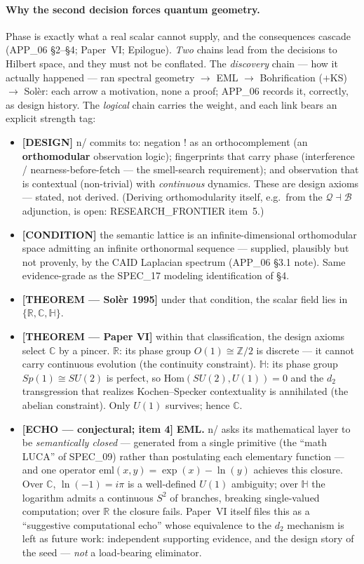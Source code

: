 \documentclass[11pt,a4paper]{article}
\newcommand{\Z}{\mathbb{Z}}
\newcommand{\C}{\mathbb{C}}
\newcommand{\HH}{\mathbb{H}}
\newcommand{\RR}{\mathbb{R}}
\theoremstyle{plain}
\theoremstyle{definition}
\theoremstyle{remark}
\begin{document}
\paragraph{Why the second decision forces quantum geometry.}
Phase is exactly what a real scalar cannot supply, and the consequences cascade
(APP\_06 \S2--\S4; Paper~VI; Epilogue). \emph{Two} chains lead from the
decisions to Hilbert space, and they must not be conflated. The
\emph{discovery} chain --- how it actually happened --- ran spectral geometry
$\to$ EML $\to$ Bohrification ($+$KS) $\to$ Sol\`er: each arrow a motivation,
none a proof; APP\_06 records it, correctly, as design history. The
\emph{logical} chain carries the weight, and each link bears an explicit
strength tag:
\begin{itemize}
  \item \textbf{[DESIGN]} n/ commits to: negation $!$ as an orthocomplement
  (an \textbf{orthomodular} observation logic); fingerprints that carry phase
  (interference / nearness-before-fetch --- the smell-search requirement); and
  observation that is contextual (non-trivial) with \emph{continuous}
  dynamics. These are design axioms --- stated, not derived. (Deriving
  orthomodularity itself, e.g.\ from the $\mathcal Q\dashv\mathcal B$
  adjunction, is open: RESEARCH\_FRONTIER item~5.)
  \item \textbf{[CONDITION]} the semantic lattice is an infinite-dimensional
  orthomodular space admitting an infinite orthonormal sequence --- supplied,
  plausibly but not provenly, by the CAID Laplacian spectrum (APP\_06 \S3.1
  note). Same evidence-grade as the SPEC\_17 modeling identification of \S4.
  \item \textbf{[THEOREM --- Sol\`er 1995]} under that condition, the scalar
  field lies in $\{\RR,\C,\HH\}$.
  \item \textbf{[THEOREM --- Paper VI]} within that classification, the design
  axioms select $\C$ by a pincer. $\RR$: its phase group $O(1)\cong\Z/2$ is
  discrete --- it cannot carry continuous evolution (the continuity
  constraint). $\HH$: its phase group $Sp(1)\cong SU(2)$ is perfect, so
  $\mathrm{Hom}(SU(2),U(1))=0$ and the $d_2$ transgression that realizes
  Kochen--Specker contextuality is annihilated (the abelian constraint). Only
  $U(1)$ survives; hence $\C$.
  \item \textbf{[ECHO --- conjectural; item 4]} \textbf{EML.} n/ asks its
  mathematical layer to be \emph{semantically closed} --- generated from a
  single primitive (the ``math LUCA'' of SPEC\_09) rather than postulating
  each elementary function --- and one operator
  $\mathrm{eml}(x,y)=\exp(x)-\ln(y)$ achieves this closure. Over $\C$,
  $\ln(-1)=i\pi$ is a well-defined $U(1)$ ambiguity; over $\HH$ the logarithm
  admits a continuous $S^2$ of branches, breaking single-valued computation;
  over $\RR$ the closure fails. Paper~VI itself files this as a ``suggestive
  computational echo'' whose equivalence to the $d_2$ mechanism is left as
  future work: independent supporting evidence, and the design story of the
  seed --- \emph{not} a load-bearing eliminator.
\end{itemize}
\end{document}
